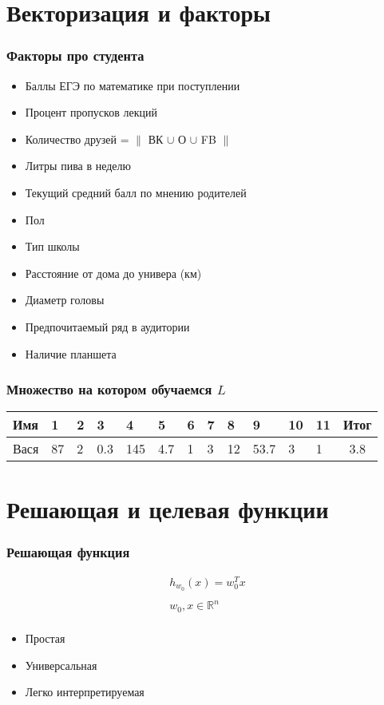 \documentclass[14pt, fleqn, xcolor={dvipsnames, table}]{beamer}
\begin{document}
\section{Векторизация и факторы}
\begin{frame}
\frametitle{Факторы про студента}
\begin{itemize}
  \item Баллы ЕГЭ по математике при поступлении
  \item Процент пропусков лекций
  \item Количество друзей = $\|$ ВК $\cup$ О $\cup$ FB $\|$
  \item Литры пива в неделю
  \item Текущий средний балл по мнению родителей
  \item Пол
  \item Тип школы
  \item Расстояние от дома до универа (км)
  \item Диаметр головы
  \item Предпочитаемый ряд в аудитории
  \item Наличие планшета
\end{itemize}
\end{frame}
\begin{frame}[t]\frametitle{Множество на котором обучаемся $L$}
\small
\begin{tabular}{l||l|l|l|l|l|l|l|l|l|l|l||c}
\hline
Имя & 1 & 2 & 3 & 4 & 5 & 6 & 7 & 8 & 9 & 10 & 11 & Итог \\
\hline\hline
Вася & 87 & 2 & 0.3 & 145 & 4.7 & 1 & 3 & 12 & 53.7 & 3 & 1 & 3.8 \\
\hline
\end{tabular}
\end{frame}

\section{Решающая и целевая функции}
\begin{frame}[t]\frametitle{Решающая функция}
    $$\begin{array}{c}
      h_{w_0}(x) = w_0^{T}x \\
      \\
      w_0, x \in \mathbb{R}^n \\
      \end{array}
    $$
\begin{itemize}
  \item Простая
  \item Универсальная
  \item Легко интерпретируемая
\end{itemize}
\end{frame}
\end{document}
